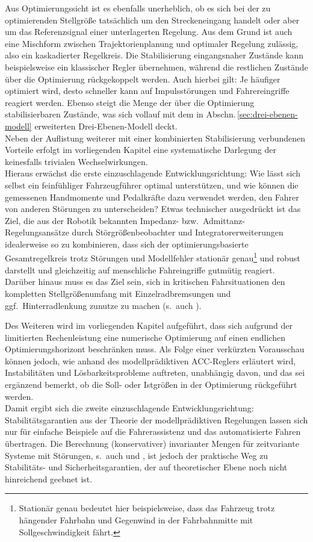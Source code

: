 Aus Optimierungssicht ist es ebenfalls unerheblich, ob es sich bei der zu optimierenden Stellgröße tatsächlich um den Streckeneingang handelt oder aber um das Referenzsignal einer unterlagerten Regelung.
 Aus dem Grund ist auch eine Mischform zwischen Trajektorienplanung und optimaler Regelung zulässig, also ein kaskadierter Regelkreis. Die Stabilisierung eingangsnaher Zustände kann beispielsweise ein klassischer Regler übernehmen, während die restlichen Zustände über die Optimierung rückgekoppelt werden. Auch hierbei gilt: Je häufiger optimiert wird, desto schneller kann auf Impulsstörungen und Fahrereingriffe reagiert werden. Ebenso steigt die Menge der über die Optimierung stabilisierbaren Zustände, was sich vollauf mit dem in Abschn.\,\ref{sec:drei-ebenen-modell} erweiterten Drei-Ebenen-Modell deckt. \\
Neben der Auflistung weiterer mit einer kombinierten Stabilisierung verbundenen Vorteile erfolgt im vorliegenden Kapitel eine systematische Darlegung der keinesfalls trivialen Wechselwirkungen. \\
Hieraus erwächst die erste einzuschlagende Entwicklungsrichtung: Wie lässt sich selbst ein feinfühliger Fahrzeugführer optimal unterstützen, und wie können die gemessenen Handmomente und Pedalkräfte dazu verwendet werden, den Fahrer von anderen Störungen zu unterscheiden? Etwas technischer ausgedrückt ist das Ziel, die aus der Robotik bekannten Impedanz- bzw.\ Admittanz-Regelungsansätze \cite{vanderborght2013variable} durch Störgrößenbeobachter und Integratorerweiterungen idealerweise so zu kombinieren, dass sich der optimierungsbasierte Gesamtregelkreis trotz Störungen und Modellfehler stationär genau\footnote{Stationär genau bedeutet hier beispielsweise, dass das Fahrzeug trotz hängender Fahrbahn und Gegenwind in der Fahrbahnmitte mit Sollgeschwindigkeit fährt.} und robust darstellt und gleichzeitig auf menschliche Fahreingriffe gutmütig reagiert. Darüber hinaus muss es das Ziel sein, sich in kritischen Fahrsituationen den kompletten Stellgrößenumfang mit Einzelradbremsungen und ggf.\ Hinterradlenkung zunutze zu machen (s.\ auch \cite{dang2012steering}).

Des Weiteren wird im vorliegenden Kapitel aufgeführt, dass sich aufgrund der limitierten Rechenleistung eine numerische Optimierung auf einen endlichen Optimierungshorizont beschränken muss.
Als Folge einer verkürzten Vorausschau können jedoch, wie anhand des modellprädiktiven ACC-Reglers erläutert wird, Instabilitäten und Lösbarkeitsprobleme auftreten, unabhängig davon, und das sei ergänzend bemerkt, ob die Soll- oder Istgrößen in der Optimierung rückgeführt werden. \\
Damit ergibt sich die zweite einzuschlagende Entwicklungsrichtung: Stabilitätsgarantien aus der Theorie der modellprädiktiven Regelungen lassen sich nur für einfache Beispiele auf die Fahrerassistenz und das automatisierte Fahren übertragen. Die Berechnung (konservativer) invarianter Mengen für zeitvariante Systeme mit Störungen, s.\ auch  und \cite{lawitzkyinteractive, Lawitzky2014ICRA}, ist jedoch der praktische Weg zu Stabilitäts- und Sicherheitsgarantien, der auf theoretischer Ebene noch nicht hinreichend geebnet ist. 

